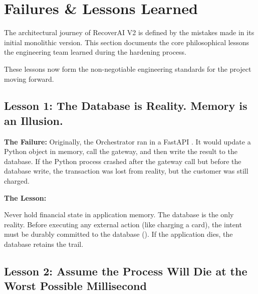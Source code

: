 
\section{Failures \& Lessons Learned}

\begin{tcolorbox}[summarybox={\iconBulb[1.5] Engineering Truths Learned the Hard Way}]
\color{textdark}
The architectural journey of RecoverAI V2 is defined by the mistakes made in its initial monolithic version. This section documents the core philosophical lessons the engineering team learned during the hardening process. 

These lessons now form the non-negotiable engineering standards for the project moving forward.
\end{tcolorbox}

\vspace{0.8cm}

\subsection{Lesson 1: The Database is Reality. Memory is an Illusion.}

\textbf{The Failure:} Originally, the Orchestrator ran in a FastAPI . It would update a Python object in memory, call the gateway, and then write the result to the database. If the Python process crashed after the gateway call but before the database write, the transaction was lost from reality, but the customer was still charged.

\textbf{The Lesson:}
\begin{tcolorbox}[infobox={State Exists Only in PostgreSQL}]
Never hold financial state in application memory. The database is the only reality. Before executing any external action (like charging a card), the intent must be durably committed to the database (). If the application dies, the database retains the trail.
\end{tcolorbox}

\vspace{0.5cm}

\subsection{Lesson 2: Assume the Process Will Die at the Worst Possible Millisecond}

